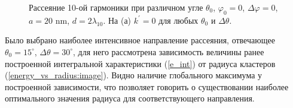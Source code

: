 
    \begin{figure}[H]
        \hfil
        \caption{Рассеяние 10-ой гармоники при различном угле $\theta_0$, $\varphi_0 = 0$, $\Delta \varphi = 0$, $a = 20$ nm, $d = 2\lambda_{10}$. На (а) $k^\prime = 0$ для любых $\theta_0$ и $\Delta \theta$.}\label{theta0_dphi:image}
    \end{figure}


Было выбрано наиболее интенсивное направление рассеяния, отвечающее $\theta_0 = 15^\circ$, $\Delta \theta = 30^\circ$, для него рассмотрена зависимость величины ранее построенной интегральной характеристики (\autoref{e_int}) от радиуса кластеров (\autoref{energy_vs_radius:image}). Видно наличие глобального максимума у построенной зависимости, что позволяет говорить о существовании наиболее оптимального значения радиуса для соответствующего направления. 



